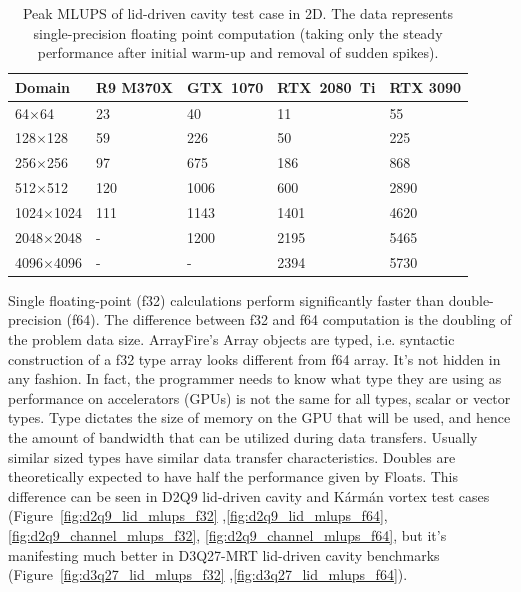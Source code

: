 \begin{table}[!ht]
	\centering\small
	{\renewcommand{\arraystretch}{1.1}%
		{\setlength{\tabcolsep}{0.5em}
			\begin{tabular}{ |p{2.7cm}||p{2.2cm}|p{2.2cm}|p{2.4cm}|p{2.1cm}|  }
				\hline
				Domain & R9 M370X & GTX~1070 & RTX~2080~Ti & RTX 3090 \\
				\hline
				64$\times$64   & 23 & 40  & 11  & 55  \\
				\hline
				128$\times$128   & 59 & 226  & 50   & 225  \\
				\hline
				256$\times$256   & 97 & 675  & 186   & 868  \\
				\hline
				512$\times$512   & 120 & 1006  & 600   & 2890  \\
				\hline
				1024$\times$1024   & 111 & 1143   & 1401   & 4620  \\
				\hline
				2048$\times$2048   & - & 1200  & 2195  & 5465  \\
				\hline
				4096$\times$4096   & - & -  & 2394  & 5730  \\
				\hline
	\end{tabular}}}
	\caption{Peak MLUPS of lid-driven cavity test case in 2D. The data represents single-precision floating point computation (taking only the steady performance after initial warm-up and removal of sudden spikes).}
	\label{tab:lid-mlups-all-2d}
\end{table}

Single floating-point (f32) calculations perform significantly faster than double-precision (f64). The difference between f32 and f64 computation is the doubling of the problem data size. ArrayFire's Array objects are typed, i.e. syntactic construction of a f32 type array looks different from f64 array. It's not hidden in any fashion. In fact, the programmer needs to know what type they are using as performance on accelerators (GPUs) is not the same for all types, scalar or vector types. Type dictates the size of memory on the GPU that will be used, and hence the amount of bandwidth that can be utilized during data transfers. Usually similar sized types have similar data transfer characteristics. Doubles are theoretically expected to have half the performance given by Floats. This difference can be seen in D2Q9 lid-driven cavity and Kármán vortex test cases (Figure~\ref{fig:d2q9_lid_mlups_f32} ,\ref{fig:d2q9_lid_mlups_f64}, \ref{fig:d2q9_channel_mlups_f32}, \ref{fig:d2q9_channel_mlups_f64}, but it's manifesting much better in D3Q27-MRT lid-driven cavity benchmarks (Figure~\ref{fig:d3q27_lid_mlups_f32} ,\ref{fig:d3q27_lid_mlups_f64}).

